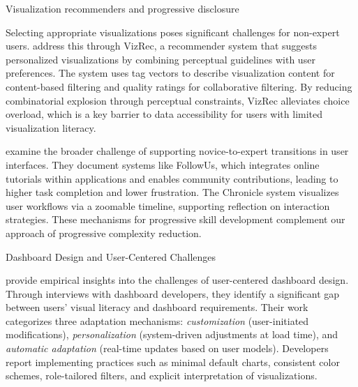 \documentclass[]{hdsr}
\makeatletter
\def\subsection{\@startsection{subsection}{2}%
  \z@{.5\linespacing\@plus.7\linespacing}{.5\linespacing}%
  {\normalfont\bfseries}}
\theoremstyle{plain}      %
\theoremstyle{definition} %
\theoremstyle{remark}     %
\makeatother
\begin{document}
\subsection{Visualization recommenders and progressive disclosure}

Selecting appropriate visualizations poses significant challenges for non-expert users. \citet{mutlu2016vizrec} address this through VizRec, a recommender system that suggests personalized visualizations by combining perceptual guidelines with user preferences. The system uses tag vectors to describe visualization content for content-based filtering and quality ratings for collaborative filtering. By reducing combinatorial explosion through perceptual constraints, VizRec alleviates choice overload, which is a key barrier to data accessibility for users with limited visualization literacy.

\vspace{1em}

\noindent \citet{cockburn2014supportingnoviceto} examine the broader challenge of supporting novice-to-expert transitions in user interfaces. They document systems like FollowUs, which integrates online tutorials within applications and enables community contributions, leading to higher task completion and lower frustration. The Chronicle system visualizes user workflows via a zoomable timeline, supporting reflection on interaction strategies. These mechanisms for progressive skill development complement our approach of progressive complexity reduction.

\subsection{Dashboard Design and User-Centered Challenges}

\noindent \citet{alhamadi2022dataqualitymismatched} provide empirical insights into the challenges of user-centered dashboard design. Through interviews with dashboard developers, they identify a significant gap between users' visual literacy and dashboard requirements. Their work categorizes three adaptation mechanisms: \textit{customization} (user-initiated modifications), \textit{personalization} (system-driven adjustments at load time), and \textit{automatic adaptation} (real-time updates based on user models). Developers report implementing practices such as minimal default charts, consistent color schemes, role-tailored filters, and explicit interpretation of visualizations.

\vspace{1em}
\end{document}
